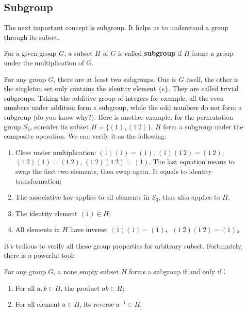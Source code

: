\documentclass{article}
\begin{document}
\begin{Exercise}
\end{Exercise}

\subsection{Subgroup}

The next important concept is subgroup. It helps us to understand a group through its subset.

\begin{definition}
For a given group $G$, a subset $H$ of $G$ is called \textbf{subgroup} if $H$ forms a group under the multiplication of $G$.
\end{definition}

For any group $G$, there are at least two subgroups. One is $G$ itself, the other is the singleton set only contains the identity element $\{e\}$. They are called trivial subgroups. Taking the additive group of integers for example, all the even numbers under addition form a subgroup, while the odd numbers do not form a subgroup (do you know why?). Here is another example, for the permutation group $S_3$, consider its subset $H = \{(1), (1\ 2)\}$. $H$ form a subgroup under the composite operation. We can verify it as the following:

\begin{enumerate}
\item Close under multiplication: $(1)(1) = (1)$, $(1)(1\ 2) = (1\ 2)$, $(1\ 2)(1) = (1\ 2)$, $(1\ 2) (1\ 2) = (1)$. The last equation means to swap the first two elements, then swap again. It equals to identity transformation;
\item The associative law applies to all elements in $S_3$, thus also applies to $H$;
\item The identity element $(1) \in H$;
\item All elements in $H$ have inverse: $(1)(1) = (1)$、$(1\ 2) (1\ 2) = (1)$。
\end{enumerate}

It's tedious to verify all these group properties for arbitrary subset. Fortunately, there is a powerful tool:

\begin{theorem}
For any group $G$, a none empty subset $H$ forms a subgroup if and only if：
\begin{enumerate}
\item For all $a, b \in H$, the product $ab \in H$;
\item For all element $a \in H$, its reverse $a^{-1} \in H$.
\end{enumerate}
\label{theorem:subgroup}
\end{theorem}
\end{document}
